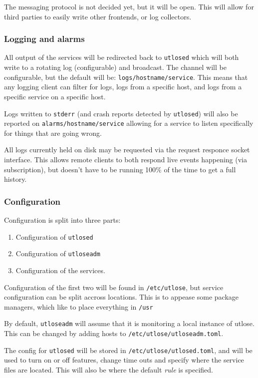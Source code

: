 \documentclass{article}
\begin{document}
The messaging protocol is not decided yet, but it will be open. This will allow for third parties to easily
write other frontends, or log collectors.

\subsubsection{Logging and alarms}
All output of the services will be redirected back to \texttt{utlosed} which will both write to a rotating log
(configurable) and broadcast. The channel will be configurable, but the default will be: \texttt{logs/hostname/service}.
This means that any logging client can filter for logs, logs from a specific host, and logs from a specific service on a specific
host.

Logs written to \texttt{stderr} (and crash reports detected by \texttt{utlosed}) will also be reported on \texttt{alarms/hostname/service}
allowing for a service to listen specifically for things that are going wrong.

All logs currently held on disk may be requested via the request responce socket interface. This allows remote clients to both
respond live events happening (via subscription), but doesn't have to be running 100\% of the time to get a full history.

\subsubsection{Configuration}
Configuration is split into three parts:
\begin{enumerate}
  \item Configuration of \texttt{utlosed}
  \item Configuration of \texttt{utloseadm}
  \item Configuration of the services.
\end{enumerate}

Configuration of the first two will be found in \texttt{/etc/utlose}, but service configuration can be split
accross locations. This is to appease some package managers, which like to place everything in \texttt{/usr}

By default, \texttt{utloseadm} will assume that it is monitoring a local instance of utlose. This can be changed
by adding hosts to \texttt{/etc/utlose/utloseadm.toml}.

The config for \texttt{utlosed} will be stored in \texttt{/etc/utlose/utlosed.toml}, and will be used to turn on or off features,
change time outs and specify where the service files are located. This will also be where the default \textit{rule} is specified.
\end{document}
